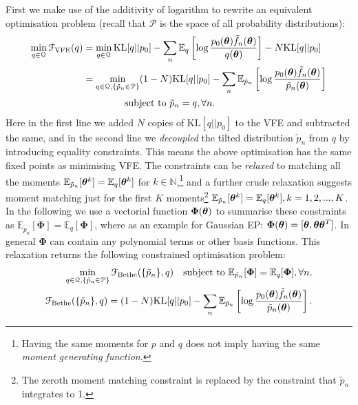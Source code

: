 First we make use of the additivity of logarithm to rewrite an equivalent optimisation problem (recall that $\mathcal{P}$ is the space of all probability distributions):
\begin{equation}
\begin{aligned}
\min_{q \in \mathcal{Q}} \mathcal{F}_{\text{VFE}}(q)
&= \min_{q \in \mathcal{Q}} \mathrm{KL}[q||p_0] - \sum_n \mathbb{E}_{q} \left[ \log \frac{p_0(\bm{\theta}) \tilde{f}_n(\bm{\theta})}{q(\bm{\theta})} \right] - N \mathrm{KL}[q || p_0] \\
& = \min_{ q \in \mathcal{Q}, \{ \tilde{p}_n \in \mathcal{P} \} } (1 - N) \mathrm{KL}[q||p_0] - \sum_n \mathbb{E}_{\tilde{p}_n} \left[ \log \frac{p_0(\bm{\theta}) \tilde{f}_n(\bm{\theta})}{\tilde{p}_n(\bm{\theta})} \right] \\ 
& \quad \quad \quad \quad \text{ subject to } \tilde{p}_n = q, \forall n. 
\end{aligned}
\label{eq:vi_constrained}
\end{equation}
%
Here in the first line we added $N$ copies of $\mathrm{KL}[q || p_0]$ to the VFE and subtracted the same, and in the second line we \emph{decoupled} the tilted distribution $\tilde{p}_n$ from $q$ by introducing equality constraints. This means the above optimisation has the same fixed points as minimising VFE. The constraints can be \emph{relaxed} to matching all the moments $\mathbb{E}_{\tilde{p}_n}[\bm{\theta}^{k}] = \mathbb{E}_q[\bm{\theta}^k]$ for $k \in \mathbb{N}$,\footnote{Having the same moments for $p$ and $q$ does not imply having the same \emph{moment generating function}.} and a further crude relaxation suggests moment matching just for the first $K$ moments\footnote{The zeroth moment matching constraint is replaced by the constraint that $\tilde{p}_n$ integrates to 1.}
$\mathbb{E}_{\tilde{p}_n}[\bm{\theta}^{k}] = \mathbb{E}_q[\bm{\theta}^k], k = 1, 2, ..., K$.
%
In the following we use a vectorial function $\bm{\Phi}(\bm{\theta})$ to summarise these constraints as $\mathbb{E}_{\tilde{p}_n}[\bm{\Phi}] = \mathbb{E}_q[\bm{\Phi}]$, where as an example for Gaussian EP: $\bm{\Phi}(\bm{\theta}) = [\bm{\theta}, \bm{\theta} \bm{\theta}^T]$. In general $\bm{\Phi}$ can contain any polynomial terms or other basis functions. This relaxation returns the following constrained optimisation problem:
%
\begin{equation}
\begin{aligned}
 \min_{ q \in \mathcal{Q}, \{ \tilde{p}_n \in \mathcal{P} \} } \mathcal{F}_{\text{Bethe}}( \{ \tilde{p}_n \}, q) \quad \text{subject to } \mathbb{E}_{\tilde{p}_n}[\bm{\Phi}] = \mathbb{E}_q[\bm{\Phi}], \forall n, \\
\mathcal{F}_{\text{Bethe}}( \{ \tilde{p}_n \}, q) =  (1 - N) \mathrm{KL}[q||p_0] - \sum_n \mathbb{E}_{\tilde{p}_n} \left[ \log \frac{p_0(\bm{\theta}) \tilde{f}_n(\bm{\theta})}{\tilde{p}_n(\bm{\theta})} \right].
\end{aligned}
\label{eq:bethe}
\end{equation}
